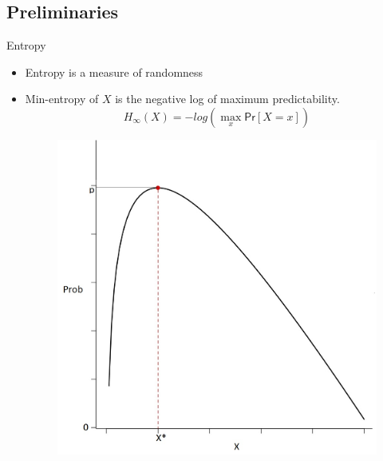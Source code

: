 \documentclass{beamer}
\begin{document}
\subsection{Preliminaries}

\begin{frame}{Entropy}
	\begin{itemize}
		\setlength\itemsep{1em}
		\item Entropy is a measure of randomness
		\item Min-entropy of $X$ is the negative log of maximum predictability.
		\begin{equation*}
		    H_{\infty}(X) = - log(\max\limits_{x} \mathsf{Pr}[X=x])
		\end{equation*}
		\begin{figure}
		    \includegraphics[scale=0.2]{min_entropy}
		\end{figure}
	\end{itemize}
\end{frame}

\end{document}

